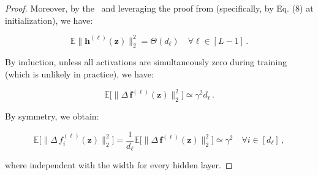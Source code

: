 \begin{proof}
Moreover, by the~ and leveraging the proof from \citet{yang2023spectral} (specifically, by Eq. (8) at initialization), we have:

\begin{equation*}
    \mathbb{E}\|\mathbf{h}^{(\ell)}(\mathbf{z})\|_2^2 = \Theta(d_{\ell}) \quad \forall \ell \in[L-1]\,.
\end{equation*}

By induction, unless all activations are simultaneously zero during training (which is unlikely in practice), we have:


\begin{equation*}
\mathbb{E}\bigl[\|\Delta\,\mathbf{f}^{(\ell)}(\mathbf{z})\|_2^2\bigr] \simeq \gamma^2 d_{\ell}\,.
\end{equation*}

By symmetry, we obtain:

\begin{equation*}
    \mathbb{E}\bigl[\|\Delta\,f^{(\ell)}_i(\mathbf{z})\|_2^2\bigr] = \frac{1}{d_{\ell}}\mathbb{E}\bigl[\|\Delta\,\mathbf{f}^{(\ell)}(\mathbf{z})\|_2^2\bigr] \simeq  \gamma^2\quad \forall i \in [d_{\ell}]\,,
\end{equation*}

where independent with the width for every hidden layer.
\end{proof}

